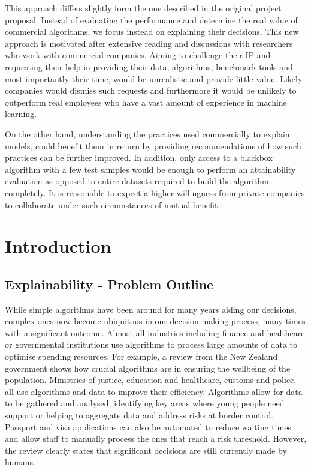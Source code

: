 \documentclass[proposal]{softeng}
\begin{document}
This approach differs slightly form the one described in the original project proposal. Instead of evaluating the performance and determine the real value of commercial algorithms, we focus instead on explaining their decisions. This new approach is motivated after extensive reading and discussions with researchers who work with commercial companies. Aiming to challenge their IP and requesting their help in providing their data, algorithms, benchmark tools and most importantly their time, would be unrealistic and provide little value. Likely companies would dismiss such requests and furthermore it would be unlikely to outperform real employees who have a vast amount of experience in machine learning. 

On the other hand, understanding the practices used commercially to explain models, could benefit them in return by providing recommendations of how such practices can be further improved. In addition, only access to a blackbox algorithm with a few test samples would be enough to perform an attainability evaluation as opposed to entire datasets required to build the algorithm completely. It is reasonable to expect a higher willingness from private companies to collaborate under such circumstances of mutual benefit. 

\section{Introduction}


\subsection{Explainability - Problem Outline}
While simple algorithms have been around for many years aiding our decisions, complex ones now become ubiquitous in our decision-making process, many times with a significant outcome. Almost all industries including finance and healthcare or governmental institutions use algorithms to process large amounts of data to optimise spending resources. For example, a review\cite{algassessment} from the New Zealand government shows how crucial algorithms are in ensuring the wellbeing of the population. Ministries of justice, education and healthcare, customs and police, all use algorithms and data to improve their efficiency. Algorithms allow for data to be gathered and analysed, identifying key areas where young people need support or helping to aggregate data and address risks at border control. Passport and visa applications can also be automated to reduce waiting times and allow staff to manually process the ones that reach a risk threshold. However, the review clearly states that significant decisions are still currently made by humans. 
\end{document}
